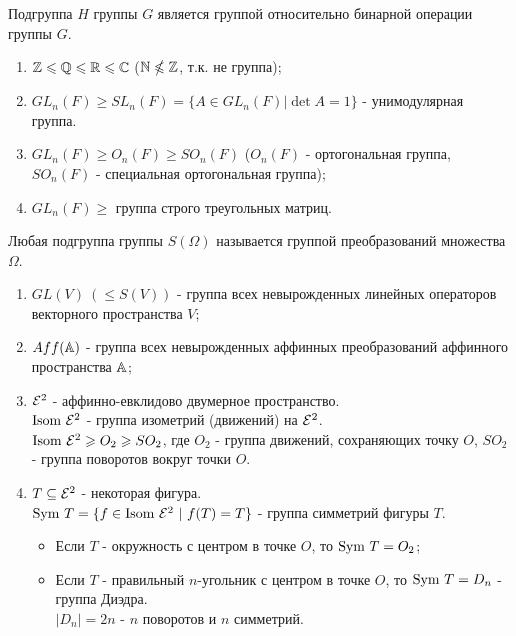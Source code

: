 \begin{subtheorem}
    Подгруппа $H$ группы $G$ является группой относительно бинарной операции группы $G$.
\end{subtheorem}
\begin{examples} \tab
    \begin{enumerate}
        \item $\mathbb{Z} \leqslant \mathbb{Q} \leqslant \mathbb{R} \leqslant \mathbb{C}$ ($\mathbb{N} \nleqslant \mathbb{Z}$, т.к. не группа);
        \item $GL_n(F) \geqslant SL_n(F) = \{A \in GL_n(F)| \det A = 1\}$ - унимодулярная группа.
        \item $GL_n(F) \geqslant O_n(F) \geqslant SO_n(F)$ ($O_n(F)$ - ортогональная группа, $SO_n(F)$ - специальная ортогональная группа);
        \item $GL_n(F) \geqslant$ группа строго треугольных матриц.
    \end{enumerate}
\end{examples}
\begin{definition}
    Любая подгруппа группы $S(\Omega)$ называется группой преобразований множества $\Omega$.
\end{definition}
\begin{examples} \tab
    \begin{enumerate}
        \item $GL(V) \ (\leqslant S(V))$ - группа всех невырожденных линейных операторов векторного пространства $V$;
        \item $Aff(\mathbb{A})$ - группа всех невырожденных аффинных преобразований аффинного пространства $\mathbb{A}$;
        \item $\mathcal{E}^2$ - аффинно-евклидово двумерное пространство.\\
        $\textup{Isom} \ \mathcal{E}^2$ - группа изометрий (движений) на $\mathcal{E}^2$.\\
        $\textup{Isom} \ \mathcal{E}^2 \geqslant O_2 \geqslant SO_2$, где $O_2$ - группа движений, сохраняющих точку $O$, $SO_2$ - группа поворотов вокруг точки $O$.
        \item $T \subseteq \mathcal{E}^2$ - некоторая фигура.\\
        $\textup{Sym}\ T = \{f \in \textup{Isom} \ \E^2 \ | \ f(T) = T\}$ - группа симметрий фигуры $T$.
        \begin{itemize}
            \item Если $T$ - окружность с центром в точке $O$, то $\textup{Sym}\ T = O_2$;
            \item Если $T$ - правильный $n$-угольник с центром в точке $O$, то $\textup{Sym}\ T = D_n$ - группа Диэдра.\\
            $|D_n| = 2n$ - $n$ поворотов и $n$ симметрий. 
        \end{itemize}
    \end{enumerate}
\end{examples}
